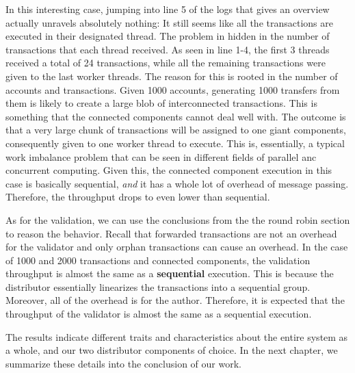 \begin{itemize}
	In this interesting case, jumping into line 5 of the logs that gives an overview actually
	unravels absolutely nothing: It still seems like all the transactions are executed in their
	designated thread. The problem in hidden in the number of transactions that each thread
	received. As seen in line 1-4, the first 3 threads received a total of 24 transactions, while
	all the remaining transactions were given to the last worker threads. The reason for this is
	rooted in the number of accounts and transactions. Given 1000 accounts, generating 1000
	transfers from them is likely to create a large blob of interconnected transactions. This is
	something that the connected components cannot deal well with. The outcome is that a very large
	chunk of transactions will be assigned to one giant components, consequently given to one worker
	thread to execute. This is, essentially, a typical work imbalance problem that can be seen in
	different fields of parallel anc concurrent computing. Given this, the connected component
	execution in this case is basically sequential, \textit{and} it has a whole lot of overhead of
	message passing. Therefore, the throughput drops to even lower than sequential.

	As for the validation, we can use the conclusions from the the round robin section to reason the
	behavior. Recall that forwarded transactions are not an overhead for the validator and only
	orphan transactions can cause an overhead. In the case of 1000 and 2000 transactions and
	connected components, the validation throughput is almost the same as a \textbf{sequential}
	execution. This is because the distributor essentially linearizes the transactions into a
	sequential group. Moreover, all of the overhead is for the author. Therefore, it is expected
	that the throughput of the validator is almost the same as a sequential execution.

\end{itemize}

The results indicate different traits and characteristics about the entire system as a whole, and
our two distributor components of choice. In the next chapter, we summarize these details into the
conclusion of our work.


